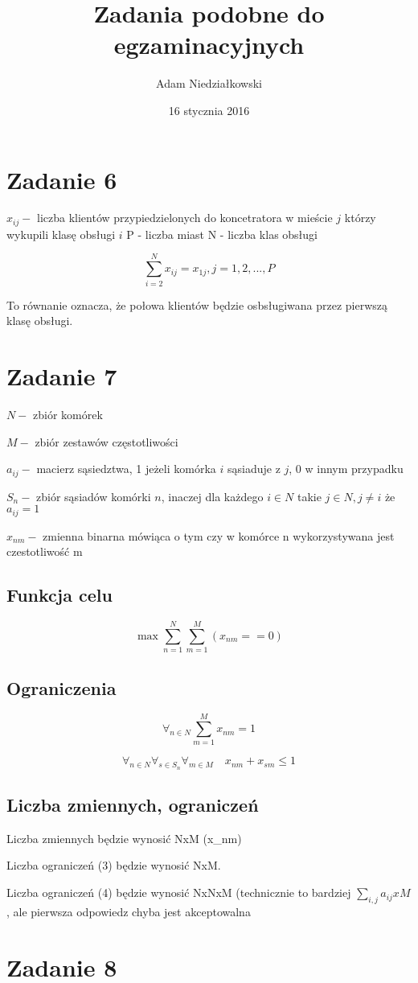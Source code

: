 \documentclass{article}
\title{Zadania podobne do egzaminacyjnych}
\author{Adam Niedziałkowski}
\date{16 stycznia 2016}
\begin{document}
\maketitle

\section{Zadanie 6}
$x_{ij} - $ liczba klientów przypiedzielonych do koncetratora w mieście $j$
którzy wykupili klasę obsługi $i$
P - liczba miast
N - liczba klas obsługi

\begin{equation}
  \sum_{i=2}^{N} x_{ij} = x_{1j} , j=1,2,...,P
\end{equation}

To równanie oznacza, że połowa klientów będzie osbsługiwana przez pierwszą klasę obsługi.

\section{Zadanie 7}


$N -$ zbiór komórek

$M -$ zbiór zestawów częstotliwości

$a_{ij} - $ macierz sąsiedztwa, 1 jeżeli komórka $i$ sąsiaduje z $j$, 0 w innym przypadku

$S_n - $ zbiór sąsiadów komórki $n$, inaczej dla każdego $i \in N$ takie $j \in N, j \neq i$ że $a_{ij} = 1$

$x_{nm} - $ zmienna binarna mówiąca o tym czy w komórce n wykorzystywana jest czestotliwość m

\subsection{Funkcja celu}
\begin{equation}
  \max \sum_{n=1}^N \sum_{m=1}^M (x_{nm} == 0)
\end{equation}

\subsection{Ograniczenia}

\begin{equation}
  \forall_{n \in N} \sum_{m=1}^{M} x_{nm} = 1
\end{equation}

\begin{equation}
  \forall_{n \in N} \forall_{s \in S_n} \forall_{m \in M} \quad x_{nm} + x_{sm} \le 1
\end{equation}

\subsection{Liczba zmiennych, ograniczeń}

Liczba zmiennych będzie wynosić NxM (x_{nm})

Liczba ograniczeń (3) będzie wynosić NxM.

Liczba ograniczeń (4) będzie wynosić NxNxM (technicznie to bardziej $\sum_{i,j} a_{ij} x M$, ale pierwsza odpowiedz chyba jest akceptowalna


\section{Zadanie 8}
\end{document}
